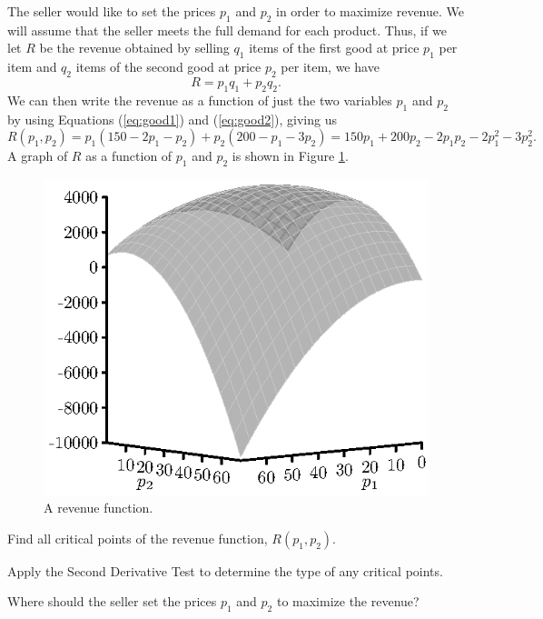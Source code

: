 \begin{activity}
  The seller would like to
  set the prices $p_1$ and $p_2$ in order to maximize revenue. 
  We will assume that the seller meets the full demand for each product. Thus, if we let $R$ be the revenue obtained by
  selling $q_1$ items of the first good at price $p_1$ per item and $q_2$
  items of the second good at price $p_2$ per item, we have
  \[R = p_1q_1 + p_2q_2.\] 
  We can then write the
  revenue as a function of just the two variables $p_1$ and $p_2$ by using Equations
  (\ref{eq:good1}) and (\ref{eq:good2}), giving us
  \[R(p_1,p_2) = p_1(150 - 2p_1 - p_2) + p_2(200 - p_1 - 3p_2)= 150p_1
  + 200p_2 - 2p_1p_2 -2p_1^2 - 3p_2^2.\] A graph of $R$ as a function
  of $p_1$ and $p_2$ is shown in Figure \ref{F:10.7.Optimize1}.
  \begin{figure}[h]
    \begin{center}
      \includegraphics{figures/fig_10_7_revenue.eps}
    \end{center}
    \caption{A revenue function.}
    \label{F:10.7.Optimize1}
  \end{figure}
  \ba
  \item Find all critical points of the revenue function, $R(p_1, p_2)$.
  \item Apply the Second Derivative Test to determine the type of any
    critical points.
  \item Where should the seller set the prices $p_1$ and $p_2$ to maximize the
    revenue? 

\ea
\end{activity} 

